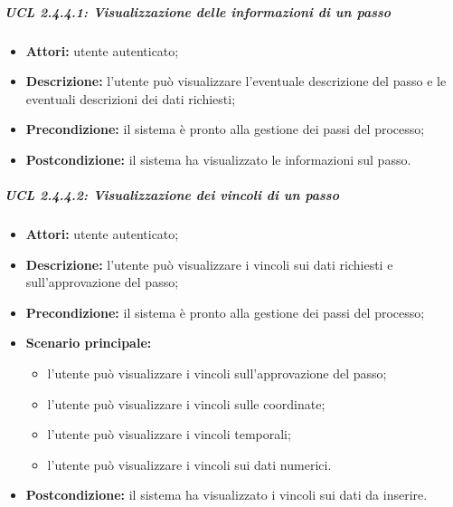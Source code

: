 \subparagraph{UCL 2.4.4.1: Visualizzazione delle informazioni di un passo}
\begin{itemize}
\item \textbf{Attori:} utente autenticato;
\item \textbf{Descrizione:} l'utente può visualizzare l'eventuale descrizione del passo e le eventuali descrizioni dei dati richiesti;
\item \textbf{Precondizione:} il sistema è pronto alla gestione dei passi del processo;
\item \textbf{Postcondizione:} il sistema ha visualizzato le informazioni sul passo.
\end{itemize}

\subparagraph{UCL 2.4.4.2: Visualizzazione dei vincoli di un passo}
\begin{itemize}
\item \textbf{Attori:} utente autenticato;
\item \textbf{Descrizione:} l'utente può visualizzare i vincoli sui dati richiesti e sull'approvazione del passo;
\item \textbf{Precondizione:} il sistema è pronto alla gestione dei passi del processo;
\item \textbf{Scenario principale:}
\begin{itemize}
\item l'utente può visualizzare i vincoli sull'approvazione del passo;
\item l'utente può visualizzare i vincoli sulle coordinate;
\item l'utente può visualizzare i vincoli temporali;
\item l'utente può visualizzare i vincoli sui dati numerici.
\end{itemize}
\item \textbf{Postcondizione:} il sistema ha visualizzato i vincoli sui dati da inserire.
\end{itemize}

